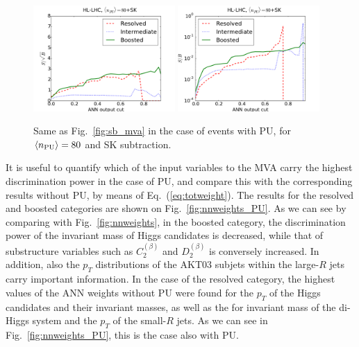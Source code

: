 \begin{figure}[t]
\begin{center}
\includegraphics[width=0.48\textwidth]{plots/ssb_SKPU80.pdf}
\includegraphics[width=0.48\textwidth]{plots/sb_SKPU80.pdf}
\caption{\small 
Same as Fig.~\ref{fig:sb_mva} in the
case of events with PU, for
 $\left\langle n_{\rm PU}\right\rangle=80$ 
  and SK subtraction.
}
\label{fig:sb_mva_PU}
\end{center}
\end{figure}

It is useful to quantify which of the input variables
to the MVA carry the highest discrimination power
in the case of PU,
and compare this with the corresponding
results without PU, by means of
Eq.~(\ref{eq:totweight}).
%
The 
results for the resolved and boosted categories are shown
on Fig.~\ref{fig:nnweights_PU}.
%
As we can see by comparing with Fig.~\ref{fig:nnweights}, 
in the boosted category, the discrimination power of the invariant
mass of Higgs candidates is decreased, while
that of  substructure
variables such as $C_2^{(\beta)}$ and
$D^{(\beta)}_2$ is conversely
increased.
%
In addition, also the $p_T$ distributions of the AKT03
subjets within the large-$R$
jets carry important information.
%
In the case of the resolved category,  the highest
values of the ANN weights without PU
were found for the $p_T$ of the 
Higgs candidates and their invariant masses, as well
as the for invariant mass of the di-Higgs system
and the $p_T$ of the small-$R$ jets.
%
As we can see in Fig.~\ref{fig:nnweights_PU},
this is the case also with PU.

